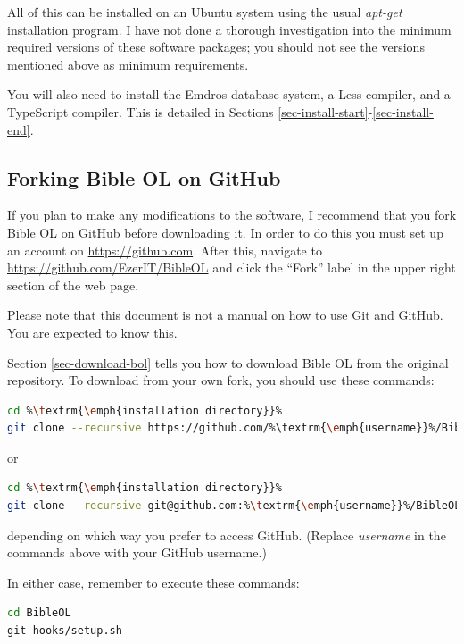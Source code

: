 \documentclass[11pt,oneside,a4paper]{memoir}
\begin{document}
All of this can be installed on an Ubuntu system using the usual \emph{apt-get} installation
program. I have not done a thorough investigation into the minimum required versions of these
software packages; you should not see the versions mentioned above as minimum requirements.

You will also need to install the Emdros database system, a Less compiler, and a TypeScript
compiler. This is detailed in Sections \ref{sec-install-start}-\ref{sec-install-end}.

\subsection{Forking Bible OL on GitHub}\label{sec-fork-github}

If you plan to make any modifications to the software, I recommend that you fork Bible OL on GitHub
before downloading it. In order to do this you must set up an account on \url{https://github.com}.
After this, navigate to \url{https://github.com/EzerIT/BibleOL} and click the ``Fork'' label in the
upper right section of the web page.

Please note that this document is not a manual on how to use Git and GitHub. You are expected to
know this.

Section \ref{sec-download-bol} tells you how to download Bible OL from the original repository. To
download from your own fork, you should use these commands:


\begin{lstlisting}[language=bash]
cd %\textrm{\emph{installation directory}}%
git clone --recursive https://github.com/%\textrm{\emph{username}}%/BibleOL
\end{lstlisting}

\noindent
or

\begin{lstlisting}[language=bash]
cd %\textrm{\emph{installation directory}}%
git clone --recursive git@github.com:%\textrm{\emph{username}}%/BibleOL.git
\end{lstlisting}

\noindent
depending on which way you prefer to access GitHub. (Replace \emph{username} in the commands above
with your GitHub username.)

In either case, remember to execute these commands:

\begin{lstlisting}[language=bash]
cd BibleOL
git-hooks/setup.sh
\end{lstlisting}
\end{document}
